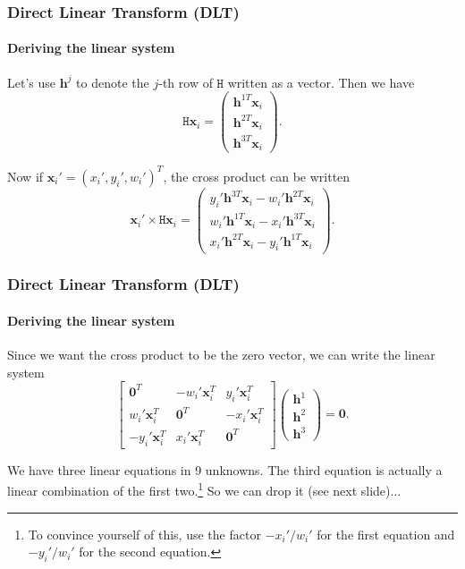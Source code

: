 \documentclass[aspectratio=169]{beamer}
\renewcommand{\vec}[1]{\boldsymbol{#1}}
\newcommand{\mat}[1]{\mathtt{#1}}
\begin{document}
\begin{frame}
\frametitle{Direct Linear Transform (DLT)}
\framesubtitle{Deriving the linear system}

Let's use $\vec{h}^{j}$ to denote the $j$-th row of $\mat{H}$ written
as a vector.  Then we have
\begin{equation*}
\mat{H}\vec{x}_i = \begin{pmatrix} \vec{h}^{1T}\vec{x}_i \\
\vec{h}^{2T}\vec{x}_i \\ \vec{h}^{3T}\vec{x}_i \end{pmatrix}.
\end{equation*}

\medskip

Now if $\vec{x}_i' = (x_i',y_i',w_i')^T$, the cross product can be written
\begin{equation*}
\vec{x}_i' \times \mat{H} \vec{x}_i = \begin{pmatrix}
y_i' \vec{h}^{3T}\vec{x}_i - w_i' \vec{h}^{2T}\vec{x}_i \\
w_i' \vec{h}^{1T}\vec{x}_i - x_i' \vec{h}^{3T}\vec{x}_i \\
x_i' \vec{h}^{2T}\vec{x}_i - y_i' \vec{h}^{1T}\vec{x}_i \end{pmatrix}.
\end{equation*}

\end{frame}

\begin{frame}
\frametitle{Direct Linear Transform (DLT)}
\framesubtitle{Deriving the linear system}

Since we want the cross product to be the zero vector, we can write
the linear system
\begin{equation*}
\begin{bmatrix}
\vec{0}^T        & -w_i'\vec{x}_i^T & y_i'\vec{x}_i^T  \\
w_i'\vec{x}_i^T  & \vec{0}^T        & -x_i'\vec{x}_i^T \\
-y_i'\vec{x}_i^T & x_i'\vec{x}_i^T  & \vec{0}^T        \end{bmatrix} 
\begin{pmatrix} \vec{h}^1 \\ \vec{h}^2 \\ \vec{h}^3 \end{pmatrix} =
\vec{0}.
\end{equation*}

\medskip

We have three linear equations in 9 unknowns.
The third equation is actually a linear combination of the first
two.\footnote{To convince yourself of this, use the factor $-x_i'/w_i'$
for the first equation and $-y_i'/w_i'$ for the second equation.}
So we can drop it (see next slide)...

\end{frame}
\end{document}

